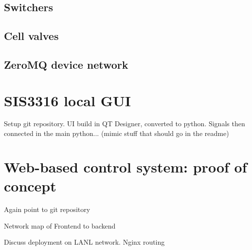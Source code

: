 
\subsection{Switchers}



\subsection{Cell valves}



\subsection{ZeroMQ device network}



\section{SIS3316 local GUI}


Setup git repository. UI build in QT Designer, converted to python. Signals then connected in the main python... (mimic stuff that should go in the readme)


\section{Web-based control system: proof of concept}


Again point to git repository

Network map of Frontend to backend

Discuss deployment on LANL network. Nginx routing